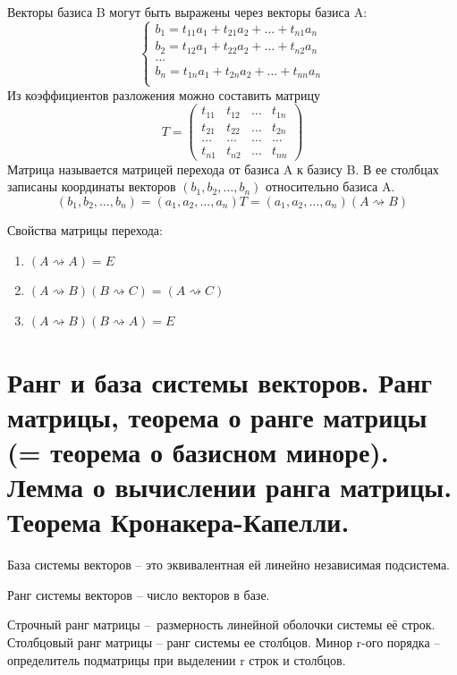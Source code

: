 \documentclass{article}
\begin{document}
Векторы базиса B могут быть выражены через векторы базиса A:
\begin{equation*}
    \begin{cases}
        b_1=t_{11}a_1+t_{21}a_2+\dots+t_{n1}a_n \\
        b_2=t_{12}a_1+t_{22}a_2+\dots+t_{n2}a_n \\
        \dots \\
        b_n=t_{1n}a_1+t_{2n}a_2+\dots+t_{nn}a_n \\
    \end{cases}
\end{equation*}
Из коэффициентов разложения можно составить матрицу $$T=
\begin{pmatrix}
    t_{11} & t_{12} & \dots & t_{1n} \\
    t_{21} & t_{22} & \dots & t_{2n} \\
    \dots & \dots & \dots & \dots \\
    t_{n1} & t_{n2} & \dots & t_{nn}
\end{pmatrix}
$$
Матрица называется \textsf{матрицей перехода} от базиса A к базису B. В ее столбцах записаны координаты векторов $(b_1,b_2,\dots,b_n)$ относительно базиса A.
$$(b_1,b_2,\dots,b_n)=(a_1,a_2,\dots,a_n)T=(a_1,a_2,\dots,a_n)(A\rightsquigarrow B)$$

Свойства матрицы перехода:
\begin{enumerate}
    \item $(A\rightsquigarrow A)=E$
    \item $(A\rightsquigarrow B)(B\rightsquigarrow C)=(A\rightsquigarrow C)$
    \item $(A\rightsquigarrow B)(B\rightsquigarrow A)=E$
\end{enumerate}

\section{Ранг и база системы векторов. Ранг матрицы, теорема о ранге матрицы (= теорема о базисном миноре). Лемма о вычислении ранга матрицы. Теорема Кронакера-Капелли.}
База системы векторов – это эквивалентная ей линейно независимая подсистема.

Ранг системы векторов – число векторов в базе.

Строчный ранг матрицы – размерность линейной оболочки системы её строк. Столбцовый ранг матрицы – ранг системы ее столбцов. Минор r-ого порядка – определитель подматрицы при выделении r строк и столбцов.
\end{document}
